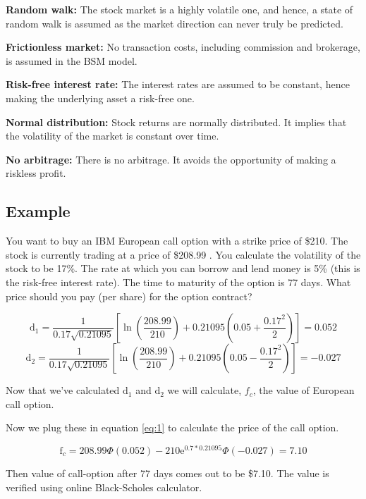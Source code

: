\documentclass[12pt]{article}
\begin{document}
\noindent
\textbf{Random walk:} The stock market is a highly volatile one, and hence, a state of random walk is assumed as the market direction can never truly be predicted.

\noindent
\textbf{Frictionless market:} No transaction costs, including commission and brokerage, is assumed in the BSM model.

\noindent
\textbf{Risk-free interest rate:} The interest rates are assumed to be constant, hence making the underlying asset a risk-free one.

\noindent
\textbf{Normal distribution:} Stock returns are normally distributed. It implies that the volatility of the market is constant over time.

\noindent
\textbf{No arbitrage:} There is no arbitrage. It avoids the opportunity of making a riskless profit.
	





\subsection{Example}
You want to buy an IBM European call option with a strike price of \$210. The stock is currently trading at a price of \$208.99 . You calculate the volatility of the stock to be 17\%. 
The rate at which you can borrow and lend money is 5\% (this is the risk-free interest rate). 
The time to maturity of the option is 77 days. What price should you pay (per share) for the option contract?

$$\mathrm d_1= \frac{1}{0.17 \sqrt{0.21095}} \left[\ln{\left(\frac{208.99}{210}\right)} + 0.21095\left(0.05 + \frac{0.17^2}{2} \right) \right]=0.052$$
$$\mathrm d_2= \frac{1}{0.17 \sqrt{0.21095}} \left[\ln{\left(\frac{208.99}{210}\right)} + 0.21095\left(0.05 - \frac{0.17^2}{2} \right) \right]=-0.027$$

Now that we've calculated $\mathrm d_1$ and $\mathrm d_2$ we will calculate, $f_c$, the value of European call option.




Now we plug these in equation \eqref{eq:1} to calculate the price of the call option.


$$\mathrm f_c= 208.99\Phi(0.052) - 210\mathrm{e}^{0.7*0.21095}\Phi(-0.027) = 7.10$$
 
Then value of call-option after 77 days comes out to be \$7.10. The value is verified using online Black-Scholes calculator.
\end{document}
